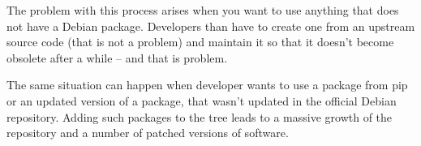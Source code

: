 The problem with this process arises when you want to use anything that does not have a Debian package. Developers than have to create one from an upstream source code (that is not a problem) and maintain it so that it doesn’t become obsolete after a while – and that is problem.

The same situation can happen when developer wants to use a package from pip \cite{pip} or an updated version of a package, that wasn’t updated in the official Debian repository. Adding such packages to the tree leads to a massive growth of the repository and a number of patched versions of software.
